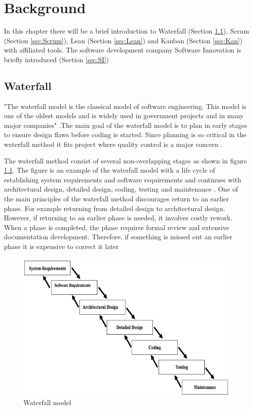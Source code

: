 \documentclass[UKenglish]{ifimaster}  %
\begin{document}
\chapter{Background}  
\label{chap:Background}                %
In this chapter there will be a brief introduction to Waterfall (Section \ref{sec:WP}), Scrum (Section \ref{sec:Scrum}), Lean (Section \ref{sec:Lean}) and Kanban (Section \ref{sec:Kan}) with affiliated tools. The software development company Software Innovation is briefly introduced (Section \ref{sec:SI})

\section {Waterfall}
\label{sec:WP}
"The waterfall model is the classical model of software engineering. This model is one of the oldest models and is widely used in government projects and in many major companies" \parencite{munassar2010comparison}.The main goal of the waterfall model is to plan in early stages to ensure design flaws before coding is started. Since planning is so critical in the waterfall method it fits project where quality control is a major concern  \parencite{munassar2010comparison}.

The waterfall method consist of several non-overlapping stages as shown in figure \ref{fig:waterfall}. The figure is an example of the waterfall model with a life cycle of establishing system requirements and software requirements and continues with architectural design, detailed design, coding, testing and maintenance  \parencite{munassar2010comparison}. One of the main principles of the waterfall method discourages return to an earlier phase. For example returning from detailed design to architectural design. However, if returning to an earlier phase is needed, it involves costly rework. When a phase is completed, the phase requires formal review and extensive documentation development. Therefore, if something is missed out an earlier phase it is expensive to correct it later  \parencite{munassar2010comparison}


\begin{figure}[ht!]
\centering
\includegraphics[scale=0.7]{Picture/waterfall.jpg}
\caption{Waterfall model}
\label{fig:waterfall} %
\end{figure}
\end{document}
